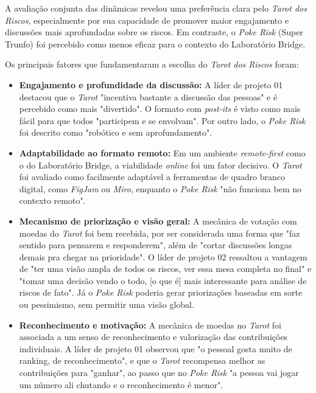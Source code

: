 \documentclass[
	12pt,
	openright,
	twoside,
	a4paper,
	english,
	brazil
	]{abntex2}
\begin{document}
A avaliação conjunta das dinâmicas revelou uma preferência clara pelo \textit{Tarot dos Riscos}, especialmente por sua capacidade de promover maior engajamento e discussões mais aprofundadas sobre os riscos. Em contraste, o \textit{Poke Risk} (Super Trunfo) foi percebido como menos eficaz para o contexto do Laboratório Bridge.

Os principais fatores que fundamentaram a escolha do \textit{Tarot dos Riscos} foram:

\begin{itemize}
    \item \textbf{Engajamento e profundidade da discussão:} A líder de projeto 01 destacou que o \textit{Tarot} "incentiva bastante a discussão das pessoas" e é percebido como mais "divertido". O formato com \textit{post-its} é visto como mais fácil para que todos "participem e se envolvam". Por outro lado, o \textit{Poke Risk} foi descrito como "robótico e sem aprofundamento". 
    \item \textbf{Adaptabilidade ao formato remoto:} Em um ambiente \textit{remote-first} como o do Laboratório Bridge, a viabilidade \textit{online} foi um fator decisivo. O \textit{Tarot} foi avaliado como facilmente adaptável a ferramentas de quadro branco digital, como \textit{FigJam} ou \textit{Miro}, enquanto o \textit{Poke Risk} "não funciona bem no contexto remoto". 
    \item \textbf{Mecanismo de priorização e visão geral:} A mecânica de votação com moedas do \textit{Tarot} foi bem recebida, por ser considerada uma forma que "faz sentido para pensarem e responderem", além de "cortar discussões longas demais pra chegar na prioridade". O líder de projeto 02 ressaltou a vantagem de "ter uma visão ampla de todos os riscos, ver essa mesa completa no final" e "tomar uma decisão vendo o todo, [o que é] mais interessante para análise de riscos de fato". Já o \textit{Poke Risk} poderia gerar priorizações baseadas em sorte ou pessimismo, sem permitir uma visão global. 
    \item \textbf{Reconhecimento e motivação:} A mecânica de moedas no \textit{Tarot} foi associada a um senso de reconhecimento e valorização das contribuições individuais. A líder de projeto 01 observou que "o pessoal gosta muito de ranking, de reconhecimento", e que o \textit{Tarot} recompensa melhor as contribuições para "ganhar", ao passo que no \textit{Poke Risk} "a pessoa vai jogar um número ali chutando e o reconhecimento é menor". 
\end{itemize}
\end{document}
